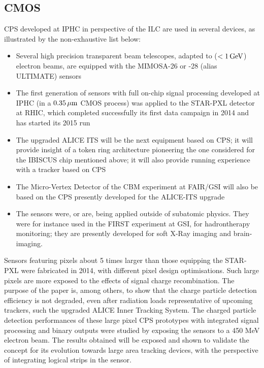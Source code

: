 \subsection{CMOS}
CPS developed at IPHC in perspective of the ILC are used in several
devices, as illustrated by the non-exhaustive list below:
\begin{itemize}
\item Several high precision transparent beam telescopes, adapted to
	($<\unit[1]{GeV}$) electron beams, are equipped with the MIMOSA-26 or
	-28 (alias ULTIMATE) sensors
\item The first generation of sensors with full on-chip signal processing
	developed at IPHC (in a $\unit[0.35]{\mu m}$ CMOS process) was applied to the
	STAR-PXL detector at RHIC, which completed successfully its first
	data campaign in 2014 and has started its 2015 run
\item The upgraded ALICE ITS will be the next equipment based on CPS;
	it will provide insight of a token ring architecture pioneering
	the one considered for the IBISCUS chip mentioned above; it will
	also provide running experience with a tracker based on CPS
\item The Micro-Vertex Detector of the CBM experiment at FAIR/GSI will
	also be based on the CPS presently developed for the ALICE-ITS
	upgrade
\item The sensors were, or are, being applied outside of subatomic physics.
	They were for instance used in the FIRST experiment at GSI, for
	hadrontherapy monitoring; they are presently developed for soft
	X-Ray imaging and brain-imaging.
\end{itemize}

Sensors featuring pixels about 5 times larger than those equipping the STAR-PXL were fabricated in 2014, with different pixel design optimisations. Such large pixels are more exposed to the effects of signal charge recombination. The purpose of the paper is, among others, to show that the charge particle detection efficiency is not degraded, even after radiation loads representative of upcoming trackers, such the upgraded ALICE Inner Tracking System. The charged particle detection performances of these large pixel CPS prototypes with integrated signal processing and binary outputs were studied by exposing the sensors to a 450 MeV electron beam. The results obtained will be exposed
and shown to validate the concept for its evolution towards large area tracking devices, with the perspective of integrating logical strips in the sensor.

